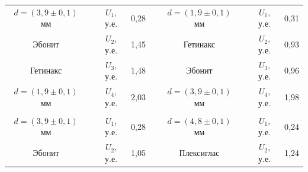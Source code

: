 \documentclass[a4paper,12pt]{article} %
\begin{document}
\begin{table}[H]
	\centering
	\begin{tabular}{ccccccccc}
		\cline{1-1} \cline{3-4} \cline{6-6} \cline{8-9}
		\multicolumn{1}{|c|}{$d = (3,9 \pm 0,1)$ мм} &
		\multicolumn{1}{c|}{} &
		\multicolumn{1}{c|}{$U_1$, у.е.} &
		\multicolumn{1}{c|}{0,28} &
		\multicolumn{1}{c|}{} &
		\multicolumn{1}{c|}{$d = (1,9 \pm 0,1)$ мм} &
		\multicolumn{1}{c|}{} &
		\multicolumn{1}{c|}{$U_1$, у.е.} &
		\multicolumn{1}{c|}{0,31} \\ \cline{1-1} \cline{3-4} \cline{6-6} \cline{8-9} 
		\multicolumn{1}{|c|}{Эбонит} &
		\multicolumn{1}{c|}{} &
		\multicolumn{1}{c|}{$U_2$, у.е.} &
		\multicolumn{1}{c|}{1,45} &
		\multicolumn{1}{c|}{} &
		\multicolumn{1}{c|}{Гетинакс} &
		\multicolumn{1}{c|}{} &
		\multicolumn{1}{c|}{$U_2$, у.е.} &
		\multicolumn{1}{c|}{0,93} \\ \cline{1-1} \cline{3-4} \cline{6-6} \cline{8-9} 
		\multicolumn{1}{|c|}{Гетинакс} &
		\multicolumn{1}{c|}{} &
		\multicolumn{1}{c|}{$U_3$, у.е.} &
		\multicolumn{1}{c|}{1,48} &
		\multicolumn{1}{c|}{} &
		\multicolumn{1}{c|}{Эбонит} &
		\multicolumn{1}{c|}{} &
		\multicolumn{1}{c|}{$U_3$, у.е.} &
		\multicolumn{1}{c|}{0,96} \\ \cline{1-1} \cline{3-4} \cline{6-6} \cline{8-9} 
		\multicolumn{1}{|c|}{$d = (1,9 \pm 0,1)$ мм} &
		\multicolumn{1}{c|}{} &
		\multicolumn{1}{c|}{$U_4$, у.е.} &
		\multicolumn{1}{c|}{2,03} &
		\multicolumn{1}{c|}{} &
		\multicolumn{1}{c|}{$d = (3,9 \pm 0,1)$ мм} &
		\multicolumn{1}{c|}{} &
		\multicolumn{1}{c|}{$U_4$, у.е.} &
		\multicolumn{1}{c|}{1,98} \\ \cline{1-1} \cline{3-4} \cline{6-6} \cline{8-9} 
		&
		&
		&
		&
		&
		&
		&
		&
		\\ \cline{1-1} \cline{3-4} \cline{6-6} \cline{8-9} 
		\multicolumn{1}{|c|}{$d = (3,9 \pm 0,1)$ мм} &
		\multicolumn{1}{c|}{} &
		\multicolumn{1}{c|}{$U_1$, у.е.} &
		\multicolumn{1}{c|}{0,28} &
		\multicolumn{1}{c|}{} &
		\multicolumn{1}{c|}{$d = (4,8 \pm 0,1)$ мм} &
		\multicolumn{1}{c|}{} &
		\multicolumn{1}{c|}{$U_1$, у.е.} &
		\multicolumn{1}{c|}{0,24} \\ \cline{1-1} \cline{3-4} \cline{6-6} \cline{8-9} 
		\multicolumn{1}{|c|}{Эбонит} &
		\multicolumn{1}{c|}{} &
		\multicolumn{1}{c|}{$U_2$, у.е.} &
		\multicolumn{1}{c|}{1,05} &
		\multicolumn{1}{c|}{} &
		\multicolumn{1}{c|}{Плексиглас} &
		\multicolumn{1}{c|}{} &
		\multicolumn{1}{c|}{$U_2$, у.е.} &
		\multicolumn{1}{c|}{1,24} \\ \cline{1-1} \cline{3-4} \cline{6-6} \cline{8-9} 

\end{tabular}
\end{table}
\end{document}
